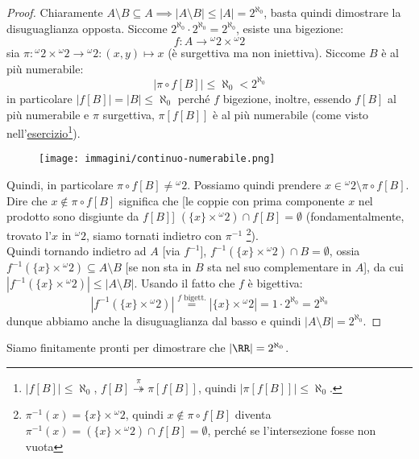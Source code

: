 \documentclass[11pt]{scrartcl}
\begin{document}
\begin{proof}
	Chiaramente $A\setminus B \subseteq A \implies |A\setminus B| \leq |A| = 2^{\aleph_0}$, basta quindi dimostrare la disuguaglianza opposta.
	Siccome $2^{\aleph_0}\cdot 2^{\aleph_0} = 2^{\aleph_0}$, esiste una bigezione:
	\[ f : A \rightarrow {}^{\omega}2 \times {}^{\omega}2
		\]
	sia $\pi : {}^{\omega}2 \times {}^{\omega}2 \rightarrow {}^{\omega}2 : (x,y) \mapsto x$ (è surgettiva ma non iniettiva). Siccome $B$ è al più numerabile:
	\[ |\pi \circ f[B]| \leq \aleph_0 < 2^{\aleph_0}
		\]
	in particolare $|f[B]| = |B| \leq \aleph_0$ perché $f$ bigezione, inoltre, essendo $f[B]$ al più numerabile e $\pi$ surgettiva, $\pi[f[B]]$ è al più numerabile (come visto nell'\hyperref[ex7.13]{esercizio}\footnote{$|f[B]| \leq \aleph_0$, $f[B] \overset{\pi}{\twoheadrightarrow} \pi[f[B]]$, quindi $|\pi[f[B]]| \leq \aleph_0$.}).
	\begin{figure}[H]
		\centering
		\texttt{[image: immagini/continuo-numerabile.png]}
	\end{figure}
	Quindi, in particolare $\pi \circ f[B] \ne {}^{\omega}2$. Possiamo quindi prendere $x \in {}^{\omega}2 \setminus \pi \circ f[B]$. Dire che $x \not \in \pi \circ f[B]$ significa
	che [le coppie con prima componente $x$ nel prodotto sono disgiunte da $f[B]$] $(\{x\} \times {}^{\omega}2) \cap f[B] = \emptyset$ (fondamentalmente, trovato l'$x$ in ${}^{\omega}2$,
	siamo tornati indietro con $\pi^{-1}$ \footnote{$\pi^{-1}(x) = \{x\} \times {}^{\omega}2$, 
	quindi $x \not\in \pi \circ f[B]$ diventa $\pi^{-1}(x) = (\{x\} \times {}^{\omega}2) \cap f[B] = \emptyset$, perché se l'intersezione fosse non vuota}).\\
	Quindi tornando indietro ad $A$ [via $f^{-1}$], $f^{-1}(\{x\} \times {}^{\omega}2) \cap B = \emptyset$, ossia $f^{-1}(\{x\} \times {}^{\omega}2) \subseteq A \setminus B$ [se 
	non sta in $B$ sta nel suo complementare in $A$], da cui $|f^{-1}(\{x\} \times {}^{\omega}2)| \leq |A \setminus B|$. Usando il fatto che $f$ è bigettiva:
	\[ |f^{-1}(\{x\} \times {}^{\omega}2)| \overset{\text{$f$ bigett.}}{=} |\{x\} \times {}^{\omega}2| = 1 \cdot 2^{\aleph_0} = 2^{\aleph_0}
		\]
	dunque abbiamo anche la disuguaglianza dal basso e quindi $|A \setminus B| = 2^{\aleph_0}$.
\end{proof}

Siamo finitamente pronti per dimostrare che $|\RR| = 2^{\aleph_0}$.
\end{document}
